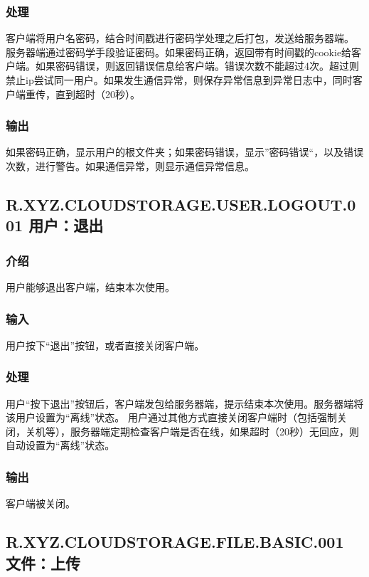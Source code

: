 \subsubsection{处理}
客户端将用户名密码，结合时间戳进行密码学处理之后打包，发送给服务器端。
服务器端通过密码学手段验证密码。如果密码正确，返回带有时间戳的cookie给客户端。如果密码错误，则返回错误信息给客户端。错误次数不能超过4次。超过则禁止ip尝试同一用户。如果发生通信异常，则保存异常信息到异常日志中，同时客户端重传，直到超时（20秒）。

\subsubsection{输出}
如果密码正确，显示用户的根文件夹；如果密码错误，显示”密码错误“，以及错误次数，进行警告。如果通信异常，则显示通信异常信息。



\subsection{R.XYZ.CLOUDSTORAGE.USER.LOGOUT.001 用户：退出 }

\subsubsection{介绍}
用户能够退出客户端，结束本次使用。

\subsubsection{输入}
用户按下“退出”按钮，或者直接关闭客户端。

\subsubsection{处理}
用户“按下退出”按钮后，客户端发包给服务器端，提示结束本次使用。服务器端将该用户设置为“离线”状态。
用户通过其他方式直接关闭客户端时（包括强制关闭，关机等），服务器端定期检查客户端是否在线，如果超时（20秒）无回应，则自动设置为“离线”状态。

\subsubsection{输出}
客户端被关闭。




\subsection{R.XYZ.CLOUDSTORAGE.FILE.BASIC.001 文件：上传}

